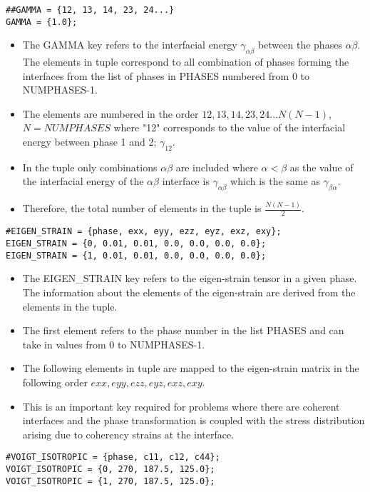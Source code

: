 \documentclass[a4paper,10pt]{article}
\begin{document}
\begin{lstlisting}
##GAMMA = {12, 13, 14, 23, 24...}
GAMMA = {1.0};
\end{lstlisting}

\begin{itemize}
 \item The GAMMA key refers to the interfacial energy $\gamma_{\alpha\beta}$ between the phases $\alpha\beta$. 
 The elements in tuple correspond to all combination of phases forming the interfaces from the list of phases in PHASES numbered from 0 to NUMPHASES-1.
 \item The elements are numbered in the order ${12,13,14,23,24 \ldots N(N-1)}$, $N=NUMPHASES$ where "12" corresponds to the value of the interfacial energy between phase 1 and 2; $\gamma_{12}$.
 \item In the tuple only combinations $\alpha\beta$ are included where $\alpha<\beta$ as the value of the interfacial energy of the $\alpha\beta$ interface is $\gamma_{\alpha\beta}$ which is the same as 
 $\gamma_{\beta\alpha}$.
 \item Therefore, the total number of elements in the tuple is $\frac{N(N-1)}{2}$.
\end{itemize}

\begin{lstlisting}
#EIGEN_STRAIN = {phase, exx, eyy, ezz, eyz, exz, exy};
EIGEN_STRAIN = {0, 0.01, 0.01, 0.0, 0.0, 0.0, 0.0};
EIGEN_STRAIN = {1, 0.01, 0.01, 0.0, 0.0, 0.0, 0.0};
\end{lstlisting}

\begin{itemize}
 \item The EIGEN\_STRAIN key refers to the eigen-strain tensor in a given phase. The information about the elements of the eigen-strain are derived from the elements in the tuple. 
 \item The first element refers to the phase number in the list PHASES and can take in values from 0 to NUMPHASES-1.
 \item The following elements in tuple are mapped to the eigen-strain matrix in the following order $exx, eyy, ezz, eyz, exz, exy$.
 \item This is an important key required for problems where there are coherent interfaces and the phase transformation is coupled with the stress distribution arising due to coherency strains at the interface.
\end{itemize}


\begin{lstlisting}
#VOIGT_ISOTROPIC = {phase, c11, c12, c44};
VOIGT_ISOTROPIC = {0, 270, 187.5, 125.0};
VOIGT_ISOTROPIC = {1, 270, 187.5, 125.0};
\end{lstlisting}
\end{document}
